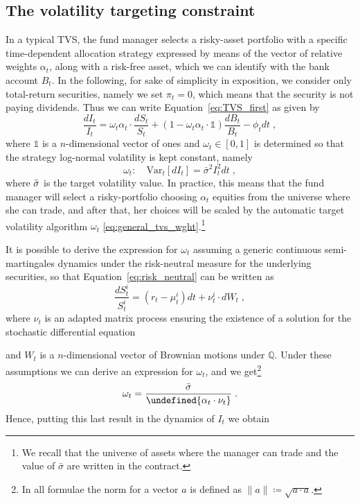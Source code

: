 \documentclass[runningheads]{m2ef}
\let\norm\undefined %
\DeclarePairedDelimiter\norm{\lVert}{\rVert}
\newcommand\soutpars[1]{\let\helpcmd\sout\parhelp#1\par\relax\relax}
\newcommand{\remove}[1]{{\color{red} \soutpars{{#1}}}}%
\begin{document}
	\subsection{The volatility targeting constraint}
	In a typical TVS, the fund manager selects a risky-asset portfolio with a specific time-dependent allocation strategy expressed by means of the vector of relative weights $\alpha_t$, along with a risk-free asset, which we can identify with the bank account $B_t$. In the following, for sake of simplicity in exposition, we consider only total-return securities, namely we set $\pi_t=0$, which means that the security is not paying dividends. Thus we can write Equation~\eqref{eq:TVS_first} as given by
	\begin{equation}
		\frac{dI_t}{I_t}= \omega_t \alpha_t \cdot \frac{dS_t}{S_t} + \left(1-\omega_t  \alpha_t \cdot \mathds{1} \right)\frac{dB_t}{B_t}- \phi_t dt \; ,
	\label{eq:TVS_elegant}\end{equation}
	where $\mathds{1}$ is a $n$-dimensional vector of ones and $\omega_t\in[0,1]$ is determined so that the strategy log-normal volatility is kept constant, namely
	\begin{equation}
			\omega_t: \quad \mathrm{Var}_t[dI_t] = \bar{\sigma}^2I_t^2dt \; ,
	\label{eq:general_tvs_wght}\end{equation}
	where $\Bar{\sigma}$ is the target volatility value.
	In practice, this means that the fund manager will select a risky-portfolio choosing $\alpha_t$ equities from the universe where she can trade, and after that, her choices will be scaled by the automatic target volatility algorithm $\omega_t$ \eqref{eq:general_tvs_wght}.\footnote{We recall that the universe of assets where the manager can trade and the value of $\bar{\sigma}$ are written in the contract.}

	It is possible to derive the expression for $\omega_t$ assuming a generic continuous semi-martingales dynamics under the risk-neutral measure for the underlying securities, so that Equation~\eqref{eq:risk_neutral} can be written as 
	\begin{equation}
		\frac{dS_t^i}{S_t^i} = \left(r_t - \mu_t^i \right)dt + \nu_t^i \cdot dW_t \; ,
	\label{eq:Equity_process}\end{equation}
	where $\nu_t$ is an adapted matrix process ensuring the existence of a solution for the stochastic differential equation \remove{(SDE)} and $W_t$ is a $n$-dimensional vector of Brownian motions under $\mathbb{Q}$. Under these assumptions we can derive an expression for $\omega_t$, and we get\footnote{In all formulae the norm for a vector $a$ is defined as $\|a\|\coloneqq\sqrt{a\cdot a}$.}
	\begin{equation}
		\omega_t = \frac{\Bar{\sigma}}{\norm{ \alpha_t\cdot \nu_t }} \; .
	\end{equation}
	Hence, putting this last result in the dynamics of $I_t$ we obtain
\end{document}
